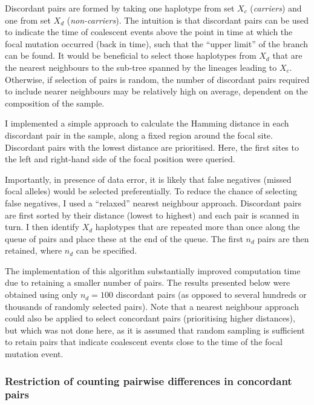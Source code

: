 Discordant pairs are formed by taking one haplotype from set $X_c$ (\emph{carriers}) and one from set $X_d$ (\emph{non-carriers}).
The intuition is that discordant pairs can be used to indicate the time of coalescent events above the point in time at which the focal mutation occurred (back in time), such that the ``upper limit'' of the branch can be found.
It would be beneficial to select those haplotypes from $X_d$ that are the nearest neighbours to the sub-tree spanned by the lineages leading to $X_c$.
Otherwise, if selection of pairs is random, the number of discordant pairs required to include nearer neighbours may be relatively high on average, dependent on the composition of the sample.

I implemented a simple approach to calculate the Hamming distance in each discordant pair in the sample, along a fixed region around the focal site.
Discordant pairs with the lowest distance are prioritised.
Here, the first  sites to the left and right-hand side of the focal position were queried.

Importantly, in presence of data error, it is likely that false negatives (missed focal alleles) would be selected preferentially.
To reduce the chance of selecting false negatives, I used a ``relaxed'' nearest neighbour approach.
Discordant pairs are first sorted by their distance (lowest to highest) and each pair is scanned in turn.
I then identify $X_d$ haplotypes that are repeated more than once along the queue of pairs and place these at the end of the queue.
The first $n_d$ pairs are then retained, where $n_d$ can be specified.

The implementation of this algorithm substantially improved computation time due to retaining a smaller number of pairs.
The results presented below were obtained using only $n_d=100$ discordant pairs (as opposed to several hundreds or thousands of randomly selected pairs).
Note that a nearest neighbour approach could also be applied to select concordant pairs (prioritising higher distances), but which was not done here, as it is assumed that random sampling is sufficient to retain pairs that indicate coalescent events close to the time of the focal mutation event.




%
\subsubsection{Restriction of counting pairwise differences in concordant pairs}
%

